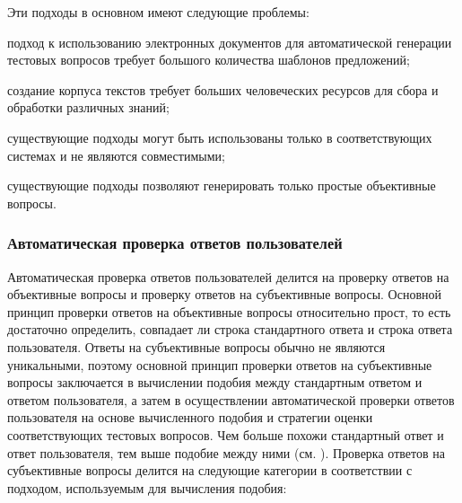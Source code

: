 Эти подходы в основном имеют следующие проблемы:

\begin{textitemize}
	\item подход к использованию электронных документов для автоматической генерации тестовых вопросов требует большого количества шаблонов предложений;
	\item создание корпуса текстов требует больших человеческих ресурсов для сбора и обработки различных знаний;
	\item существующие подходы могут быть использованы только в соответствующих системах и не являются совместимыми;
	\item существующие подходы позволяют генерировать только простые объективные вопросы.
\end{textitemize}

\subsubsection{Автоматическая проверка ответов пользователей}
\label{subsubsec_automatic_checking_user_responses}

Автоматическая проверка ответов пользователей делится на проверку ответов на объективные вопросы и проверку ответов на субъективные вопросы. Основной принцип проверки ответов на объективные вопросы относительно прост, то есть достаточно определить, совпадает ли строка стандартного ответа и строка ответа пользователя. Ответы на субъективные вопросы обычно не являются уникальными, поэтому основной принцип проверки ответов на субъективные вопросы заключается в вычислении подобия между стандартным ответом и ответом пользователя, а затем в осуществлении автоматической проверки ответов пользователя на основе вычисленного подобия и стратегии оценки соответствующих тестовых вопросов. Чем больше похожи стандартный ответ и ответ пользователя, тем выше подобие между ними (см. ). Проверка ответов на субъективные вопросы делится на следующие категории в соответствии с подходом, используемым для вычисления подобия:

